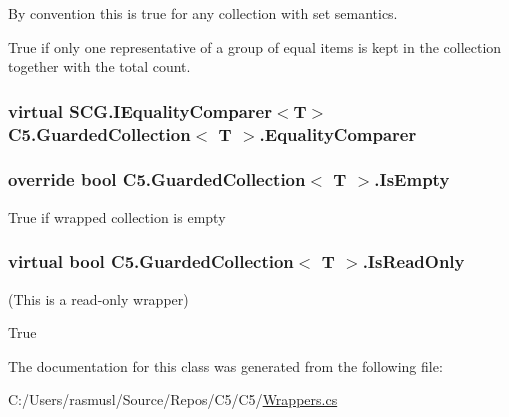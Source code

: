 By convention this is true for any collection with set semantics. 

True if only one representative of a group of equal items is kept in the collection together with the total count.\hypertarget{class_c5_1_1_guarded_collection_a71c7b8ae4fa03c0100428c7bd76db71e}{}
\subsubsection[{Equality\+Comparer}]{\setlength{\rightskip}{0pt plus 5cm}virtual S\+C\+G.\+I\+Equality\+Comparer$<$T$>$ {\bf C5.\+Guarded\+Collection}$<$ T $>$.Equality\+Comparer\hspace{0.3cm}{\ttfamily [get]}}\label{class_c5_1_1_guarded_collection_a71c7b8ae4fa03c0100428c7bd76db71e}




\hypertarget{class_c5_1_1_guarded_collection_a9a2e5fbcc49ab5a00eb4d2b929a03761}{}
\subsubsection[{Is\+Empty}]{\setlength{\rightskip}{0pt plus 5cm}override bool {\bf C5.\+Guarded\+Collection}$<$ T $>$.Is\+Empty\hspace{0.3cm}{\ttfamily [get]}}\label{class_c5_1_1_guarded_collection_a9a2e5fbcc49ab5a00eb4d2b929a03761}




True if wrapped collection is empty\hypertarget{class_c5_1_1_guarded_collection_ae7060bcf53641981bda57c113cd2e017}{}
\subsubsection[{Is\+Read\+Only}]{\setlength{\rightskip}{0pt plus 5cm}virtual bool {\bf C5.\+Guarded\+Collection}$<$ T $>$.Is\+Read\+Only\hspace{0.3cm}{\ttfamily [get]}}\label{class_c5_1_1_guarded_collection_ae7060bcf53641981bda57c113cd2e017}


(This is a read-\/only wrapper) 

True

The documentation for this class was generated from the following file\+:\begin{DoxyCompactItemize}
\item 
C\+:/\+Users/rasmusl/\+Source/\+Repos/\+C5/\+C5/\hyperlink{_wrappers_8cs}{Wrappers.\+cs}\end{DoxyCompactItemize}
